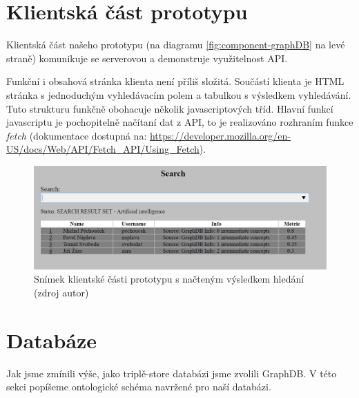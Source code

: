 \section{Klientská část prototypu}
Klientská část našeho prototypu (na diagramu \ref{fig:component-graphDB} na levé straně) komunikuje se serverovou a demonstruje využitelnost API.\par
Funkční i obsahová stránka klienta není příliš složitá. Součástí klienta je HTML stránka s jednoduchým vyhledávacím polem a tabulkou s výsledkem vyhledávání. Tuto strukturu funkčně obohacuje několik javascriptových tříd. Hlavní funkcí javascriptu je pochopitelně načítaní dat z API, to je realizováno rozhraním funkce \textit{fetch} (dokumentace dostupná na: \url{https://developer.mozilla.org/en-US/docs/Web/API/Fetch_API/Using_Fetch}).
\begin{figure}[htbp!]
	\includegraphics[width=\linewidth]{img/client.png}
	\caption{Snímek klientské části prototypu s načteným výsledkem hledání (zdroj autor)}
	\label{fig:client-screenshot}
\end{figure}

\section{Databáze}
Jak jsme zmínili výše, jako triplě-store databázi jsme zvolili GraphDB. V této sekci popíšeme ontologické schéma navržené pro naší databázi.\par
